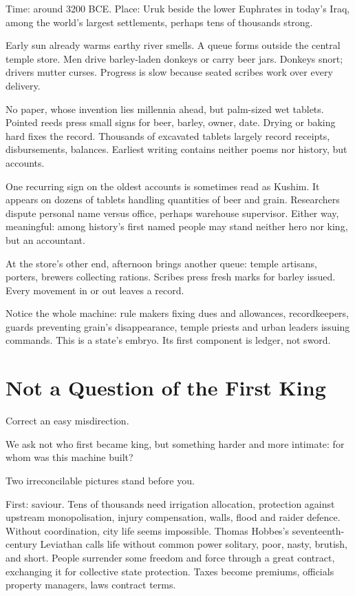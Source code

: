 Time: around 3200 BCE. Place: Uruk beside the lower Euphrates in today's Iraq, among the world's largest settlements, perhaps tens of thousands strong.

Early sun already warms earthy river smells. A queue forms outside the central temple store. Men drive barley-laden donkeys or carry beer jars. Donkeys snort; drivers mutter curses. Progress is slow because seated scribes work over every delivery.

No paper, whose invention lies millennia ahead, but palm-sized wet tablets. Pointed reeds press small signs for beer, barley, owner, date. Drying or baking hard fixes the record. Thousands of excavated tablets largely record receipts, disbursements, balances. Earliest writing contains neither poems nor history, but accounts.

One recurring sign on the oldest accounts is sometimes read as Kushim. It appears on dozens of tablets handling quantities of beer and grain. Researchers dispute personal name versus office, perhaps warehouse supervisor. Either way, meaningful: among history's first named people may stand neither hero nor king, but an accountant.

At the store's other end, afternoon brings another queue: temple artisans, porters, brewers collecting rations. Scribes press fresh marks for barley issued. Every movement in or out leaves a record.

Notice the whole machine: rule makers fixing dues and allowances, recordkeepers, guards preventing grain's disappearance, temple priests and urban leaders issuing commands. This is a state's embryo. Its first component is ledger, not sword.

\section{Not a Question of the First King}
Correct an easy misdirection.

We ask not who first became king, but something harder and more intimate: for whom was this machine built?

Two irreconcilable pictures stand before you.

First: saviour. Tens of thousands need irrigation allocation, protection against upstream monopolisation, injury compensation, walls, flood and raider defence. Without coordination, city life seems impossible. Thomas Hobbes's seventeenth-century Leviathan calls life without common power solitary, poor, nasty, brutish, and short. People surrender some freedom and force through a great contract, exchanging it for collective state protection. Taxes become premiums, officials property managers, laws contract terms.

